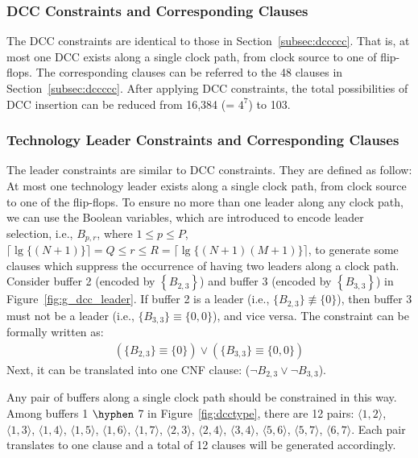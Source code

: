 \subsubsection{DCC Constraints and Corresponding Clauses}
\label{sec:TVA:dcc_c}
The DCC constraints are identical to those in Section~\ref{subsec:dccccc}. That is, at most one DCC exists along a single clock path, from clock source to one of flip-flops. The corresponding clauses can be referred to the 48 clauses in Section~\ref{subsec:dccccc}. After applying DCC constraints, the total possibilities of DCC insertion can be reduced from 16,384 (= $4^7$) to 103. 

\subsubsection{Technology Leader Constraints and Corresponding Clauses}
\label{sec:TVA:dcc_c}
The leader constraints are similar to DCC constraints. They are defined as follow: At most one technology leader exists along a single clock path, from clock source to one of the flip-flops. To ensure no more than one leader along any clock path, we can use the Boolean variables, which are introduced to encode leader selection, i.e., $B_{p,r}$, where $1 \leq p \leq P$, $\lceil \lg \{(N + 1)\} \rceil = Q \leq r \leq R = \lceil \lg \{(N + 1)(M + 1)\} \rceil$, to generate some clauses which suppress the occurrence of having two leaders along a clock path. Consider buffer 2 (encoded by $\left\{B_{2,3}\right\}$) and buffer 3 (encoded by $\left\{B_{3,3}\right\}$) in Figure~\ref{fig:g_dcc_leader}. If buffer 2 is a leader (i.e., $\{B_{2,3}\} \not\equiv \{0\}$), then buffer 3 must not be a leader (i.e., $\{B_{3,3}\} \equiv \{0, 0\}$), and vice versa. The constraint can be formally written as:
{
\fontsize{8}{8.4}
\begin{gather*}
\left(\{B_{2,3}\} \equiv \{0\}\right) \lor \left(\{B_{3,3}\} \equiv \{0, 0\}\right)
\end{gather*}
}
Next, it can be translated into one CNF clause:
{\fontsize{8}{8.4}($\neg B_{2,3}\lor\neg B_{3,3}$).} 

Any pair of buffers along a single clock path should be constrained in this way. Among buffers 1 $\hyphen$ 7 in Figure~\ref{fig:dcctype}, there are 12 pairs: $\langle1, 2\rangle$, $\langle1, 3\rangle$, $\langle1, 4\rangle$, $\langle1, 5\rangle$, $\langle1, 6\rangle$, $\langle1, 7\rangle$, $\langle2, 3\rangle$, $\langle2, 4\rangle$, $\langle3, 4\rangle$, $\langle5, 6\rangle$, $\langle5, 7\rangle$, $\langle6, 7\rangle$. Each pair translates to one clause and a total of 12 clauses will be generated accordingly.

